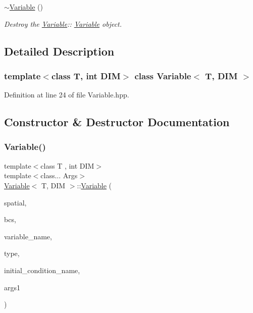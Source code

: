 \begin{DoxyCompactItemize}
\mbox{\label{classVariable_a5a9bfaa6d8079310ce7781794caff32b}} 
\hyperlink{classVariable_a5a9bfaa6d8079310ce7781794caff32b}{$\sim$\+Variable} ()
\begin{DoxyCompactList}\small\item\em Destroy the \hyperlink{classVariable}{Variable}\+:\+: \hyperlink{classVariable}{Variable} object. \end{DoxyCompactList}\end{DoxyCompactItemize}


\subsection{Detailed Description}
\subsubsection*{template$<$class T, int D\+IM$>$\newline
class Variable$<$ T, D\+I\+M $>$}



Definition at line 24 of file Variable.\+hpp.



\subsection{Constructor \& Destructor Documentation}
\mbox{\label{classVariable_a1d561592ee426bc46146b6101275955b}} 
\subsubsection{\texorpdfstring{Variable()}{Variable()}\hspace{0.1cm}{\footnotesize\ttfamily [1/9]}}
{\footnotesize\ttfamily template$<$class T , int D\+IM$>$ \\
template$<$class... Args$>$ \\
\hyperlink{classVariable}{Variable}$<$ T, D\+IM $>$\+::\hyperlink{classVariable}{Variable} (\begin{DoxyParamCaption}\item[{\hyperlink{classSpatialDiscretization}{Spatial\+Discretization}$<$ T, D\+IM $>$ $\ast$}]{spatial,  }\item[{const \hyperlink{classBoundaryConditions}{Boundary\+Conditions}$<$ T, D\+IM $>$ \&}]{bcs,  }\item[{const std\+::string \&}]{variable\+\_\+name,  }\item[{const std\+::string \&}]{type,  }\item[{const std\+::string \&}]{initial\+\_\+condition\+\_\+name,  }\item[{std\+::tuple$<$ Args... $>$}]{args1 }\end{DoxyParamCaption})}



